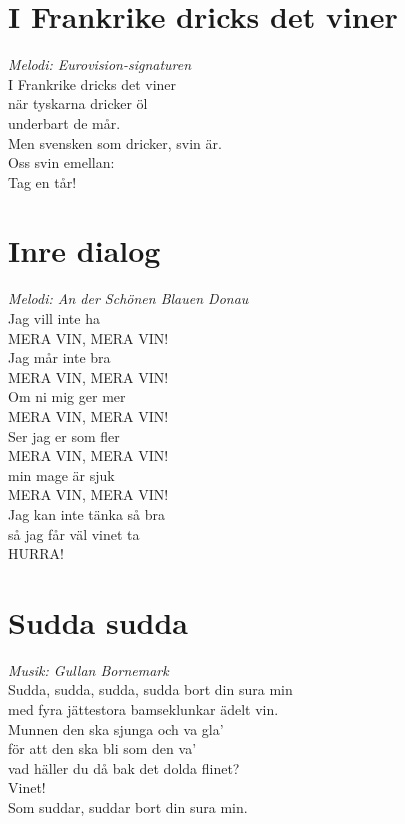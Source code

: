 \section{I Frankrike dricks det viner}
\textit{Melodi: Eurovision-signaturen}
\vspace{2mm}\\
I Frankrike dricks det viner\\
när tyskarna dricker öl\\
underbart de mår.\\
Men svensken som dricker, svin är.\\
Oss svin emellan:\\
Tag en tår!

\newpage
\section{Inre dialog}
\textit{Melodi: An der Schönen Blauen Donau }
\vspace{2mm}\\
Jag vill inte ha\\
MERA VIN, MERA VIN!\\
Jag mår inte bra\\
MERA VIN, MERA VIN!\\
Om ni mig ger mer\\
MERA VIN, MERA VIN!\\
Ser jag er som fler\\
MERA VIN, MERA VIN!\\
min mage är sjuk\\
MERA VIN, MERA VIN!\\
Jag kan inte tänka så bra\\
så jag får väl vinet ta\\
HURRA!

\section{Sudda sudda}
\textit{Musik: Gullan Bornemark}
\vspace{2mm}\\
Sudda, sudda, sudda, sudda bort din sura min\\
med fyra jättestora bamseklunkar ädelt vin.\\
Munnen den ska sjunga och va gla'\\
för att den ska bli som den va'\\
vad häller du då bak det dolda flinet?\\
Vinet!\\
Som suddar, suddar bort din sura min.

